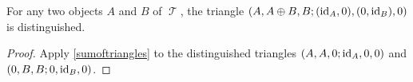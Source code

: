 \documentclass[11pt]{article}
\DeclareMathOperator{\TT}{\mathcal{T}}
\begin{document}
\begin{cor}\label{tri-dir-sum}
For any two objects $A$ and $B$ of $\TT$, the triangle $(A, A \oplus B, B; (\operatorname{id}_A,0), (0,\operatorname{id}_B),0)$ is distinguished. 
\end{cor}
\begin{proof}
Apply \autoref{sumoftriangles} to the distinguished triangles $(A,A,0; \operatorname{id}_A,0,0)$ and $(0,B,B; 0,\operatorname{id}_B,0)$.
\end{proof}

\nocite{*}

\end{document}
